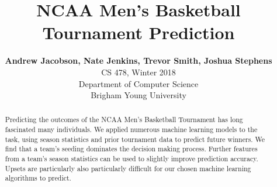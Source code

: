 \documentclass[11pt,conference]{IEEEtran}
\begin{document}
\title{NCAA Men's Basketball Tournament Prediction}

\author{
  \textbf{Andrew Jacobson, Nate Jenkins, Trevor Smith, Joshua Stephens}\\
  CS 478, Winter 2018\\
  Department of Computer Science\\
  Brigham Young University\\
}
\maketitle

\thispagestyle{plain}
\pagestyle{plain}


\begin{abstract}
Predicting the outcomes of the NCAA Men's Basketball Tournament has long fascinated many individuals.
We applied numerous machine learning models to the task, using season statistics and prior tournament data to predict future winners.
We find that a team's seeding dominates the decision making process.
Further features from a team's season statistics can be used to slightly improve prediction accuracy.
Upsets are particularly also particularly difficult for our chosen machine learning algorithms to predict.
\end{abstract}













\end{document}
